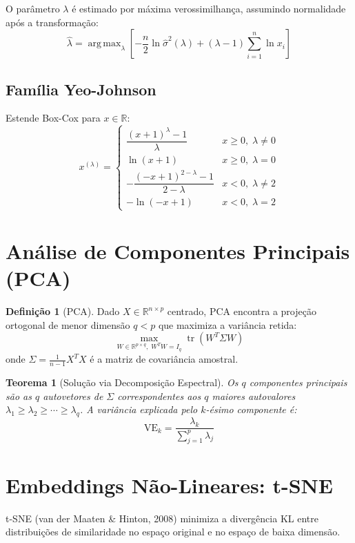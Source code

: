 \documentclass[12pt,a4paper,twoside]{book}
\newtheorem{teorema}{Teorema}[chapter]
\theoremstyle{definition}
\newtheorem{definicao}{Definição}[chapter]
\theoremstyle{remark}
\newcommand{\R}{\mathbb{R}}
\DeclareMathOperator*{\argmax}{arg\,max}
\DeclareMathOperator{\tr}{tr}
\begin{document}
O parâmetro $\lambda$ é estimado por máxima verossimilhança, assumindo normalidade após a transformação:
\[
\hat{\lambda} = \argmax_\lambda \left[ -\frac{n}{2}\ln\hat{\sigma}^2(\lambda) + (\lambda-1)\sum_{i=1}^n \ln x_i \right]
\]

\subsection{Família Yeo-Johnson}

Estende Box-Cox para $x \in \R$:
\[
x^{(\lambda)} = \begin{cases}
\dfrac{(x+1)^\lambda - 1}{\lambda} & x \geq 0,\; \lambda \neq 0 \\[4pt]
\ln(x+1) & x \geq 0,\; \lambda = 0 \\[4pt]
-\dfrac{(-x+1)^{2-\lambda}-1}{2-\lambda} & x < 0,\; \lambda \neq 2 \\[4pt]
-\ln(-x+1) & x < 0,\; \lambda = 2
\end{cases}
\]

\section{Análise de Componentes Principais (PCA)}

\begin{definicao}[PCA]
Dado $X \in \R^{n \times p}$ centrado, PCA encontra a projeção ortogonal de menor dimensão $q < p$ que maximiza a variância retida:
\[
\max_{W \in \R^{p \times q},\; W^TW = I_q} \tr(W^T \Sigma W)
\]
onde $\Sigma = \frac{1}{n-1}X^TX$ é a matriz de covariância amostral.
\end{definicao}

\begin{teorema}[Solução via Decomposição Espectral]
Os $q$ componentes principais são as $q$ autovetores de $\Sigma$ correspondentes aos $q$ maiores autovalores $\lambda_1 \geq \lambda_2 \geq \cdots \geq \lambda_q$.
A variância explicada pelo $k$-ésimo componente é:
\[
\text{VE}_k = \frac{\lambda_k}{\sum_{j=1}^p \lambda_j}
\]
\end{teorema}

\section{Embeddings Não-Lineares: t-SNE}

t-SNE (van der Maaten \& Hinton, 2008) minimiza a divergência KL entre distribuições de similaridade no espaço original e no espaço de baixa dimensão.
\end{document}
